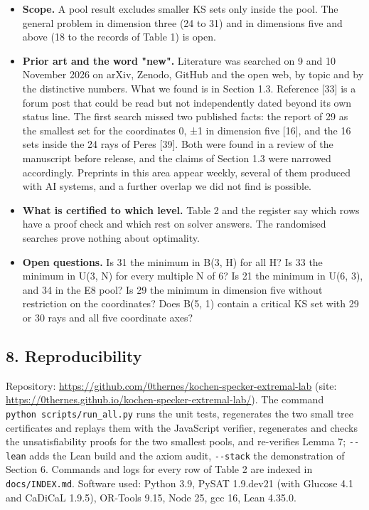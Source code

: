 \documentclass[11pt,a4paper]{article}
\providecommand{\tightlist}{\setlength{\itemsep}{0pt}\setlength{\parskip}{0pt}}
\begin{document}
\begin{itemize}
\tightlist
\item
  \textbf{Scope.} A pool result excludes smaller KS sets only inside the pool. The general problem in
  dimension three (24 to 31) and in dimensions five and above (18 to the records of Table 1) is open.
\item
  \textbf{Prior art and the word "new".} Literature was searched on 9 and 10 November 2026 on arXiv, Zenodo,
  GitHub and the open web, by topic and by the distinctive numbers. What we found is in Section 1.3.
  Reference {[}33{]} is a forum post that could be read but not independently dated beyond its own
  status line. The first search missed two published facts: the report of 29 as the smallest set for
  the coordinates 0, ±1 in dimension five {[}16{]}, and the 16 sets inside the 24 rays of Peres {[}39{]}. Both
  were found in a review of the manuscript before release, and the claims of Section 1.3 were narrowed
  accordingly. Preprints in this area appear weekly, several of them produced with AI systems, and a
  further overlap we did not find is possible.
\item
  \textbf{What is certified to which level.} Table 2 and the register say which rows have a proof check and
  which rest on solver answers. The randomised searches prove nothing about optimality.
\item
  \textbf{Open questions.} Is 31 the minimum in B(3, H) for all H? Is 33 the minimum in U(3, N) for every
  multiple N of 6? Is 21 the minimum in U(6, 3), and 34 in the E8 pool? Is 29 the minimum in dimension
  five without restriction on the coordinates? Does B(5, 1) contain a critical KS set with 29 or 30
  rays and all five coordinate axes?
\end{itemize}

\subsection{8. Reproducibility}\label{8-reproducibility}

Repository: \url{https://github.com/0thernes/kochen-specker-extremal-lab} (site:
\url{https://0thernes.github.io/kochen-specker-extremal-lab/}). The command \texttt{python\ scripts/run\_all.py} runs
the unit tests, regenerates the two small tree certificates and replays them with the JavaScript
verifier, regenerates and checks the unsatisfiability proofs for the two smallest pools, and
re-verifies Lemma 7; \texttt{-\/-lean} adds the Lean build and the axiom audit, \texttt{-\/-stack} the demonstration of
Section 6. Commands and logs for every row of Table 2 are indexed in \texttt{docs/INDEX.md}. Software used:
Python 3.9, PySAT 1.9.dev21 (with Glucose 4.1 and CaDiCaL 1.9.5), OR-Tools 9.15, Node 25, gcc 16,
Lean 4.35.0.
\end{document}
